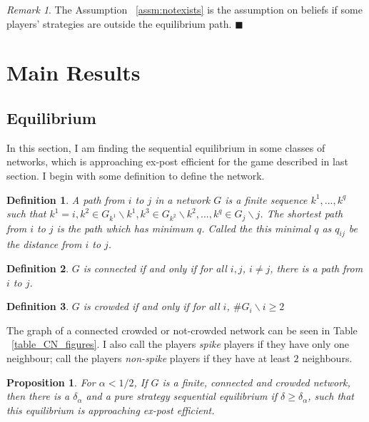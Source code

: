 \documentclass[12pt,letter]{article}
\newtheorem{proposition}{Proposition}[section]
\newtheorem{definition}{Definition}[section]
\theoremstyle{remark}
\theoremstyle{remark}
\newtheorem*{remark}{Remark}
\theoremstyle{claim}
\begin{document}
\begin{remark}
The Assumption ~\ref{assm:notexists} is the assumption on beliefs if some players' strategies are outside the equilibrium path. $\blacksquare$
\end{remark}



\section{Main Results}
\label{sec:results}
\subsection{Equilibrium}
In this section, I am finding the sequential equilibrium in some classes of networks, which is approaching ex-post efficient for the game described in last section. I begin with some definition to define the network.

\begin{definition}
A path from $i$ to $j$ in a network $G$ is a finite sequence $k^1,...,k^q$ such that $k^1=i, k^2\in G_{k^1}\backslash k^1, k^3\in G_{k^2}\backslash k^2,...,k^q\in G_j\backslash j$. The shortest path from $i$ to $j$ is the path which has minimum $q$. Called the this minimal $q$ as $q_{ij}$ be the \textit{distance} from $i$ to $j$.
\end{definition}

\begin{definition}
$G$ is connected if and only if for all $i,j$, $i\neq j$, there is a path from $i$ to $j$.
\end{definition}

\begin{definition}
$G$ is crowded if and only if for all $i$, $\# G_i\backslash i\geq 2$
\end{definition}




The graph of a connected crowded or not-crowded network can be seen in Table ~\ref{table_CN_figures}. I also call the players \textit{spike} players if they have only one neighbour; call the players \textit{non-spike} players if they have at least $2$ neighbours.

\begin{proposition}
\label{prop:crowded}
For $\alpha<1/2$, If $G$ is a finite, connected and crowded network, then there is a $\delta_{\alpha}$ and a pure strategy sequential equilibrium if $\delta\geq\delta_{\alpha}$, such that this equilibrium is approaching ex-post efficient.
\end{proposition}
\end{document}
